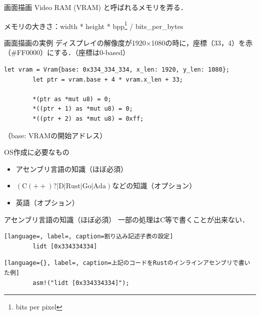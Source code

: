 \documentclass[titlepage,dvipdfmx,uplatex,a4j,12pt]{beamer}
\begin{document}
\begin{frame}{画面描画}
    Video RAM (VRAM) と呼ばれるメモリを弄る．

    メモリの大きさ：width * height * bpp\footnote{bits per pixel} / bits\_per\_bytes
\end{frame}

\begin{frame}[fragile]{画面描画の実例}
    ディスプレイの解像度が1920$\times$1080の時に，座標（33，4）を赤（\#FF0000）にする．（座標は0-based）

    \begin{lstlisting}[language={}, label=code:vram, caption=コード]
        let vram = Vram{base: 0x334_334_334, x_len: 1920, y_len: 1080};
        let ptr = vram.base + 4 * vram.x_len + 33;

        *(ptr as *mut u8) = 0;
        *((ptr + 1) as *mut u8) = 0;
        *((ptr + 2) as *mut u8) = 0xff;
    \end{lstlisting}
    （base: VRAMの開始アドレス）
\end{frame}

\begin{frame}{OS作成に必要なもの}
    \begin{itemize}
        \item アセンブリ言語の知識（ほぼ必須）
        \item $\mathrm{\left( C\left( ++ \right)?|D|Rust|Go|Ada \right)}$などの知識（オプション）
        \item 英語（オプション）
    \end{itemize}
\end{frame}

\begin{frame}[fragile]{アセンブリ言語の知識（ほぼ必須）}
    一部の処理はC等で書くことが出来ない．

    \begin{lstlisting}[language=, label=, caption=割り込み記述子表の設定]
        lidt [0x334334334]
    \end{lstlisting}

    \begin{lstlisting}[language={}, label=, caption=上記のコードをRustのインラインアセンブリで書いた例]
        asm!("lidt [0x334334334]");
    \end{lstlisting}
\end{frame}
\end{document}
